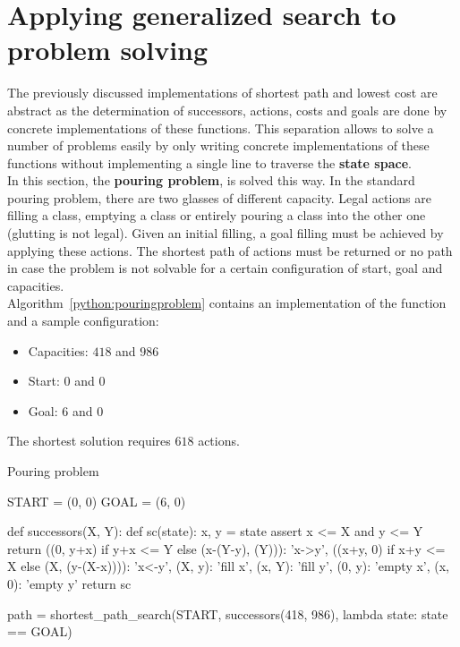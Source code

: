 \documentclass{report}
\begin{document}
\section{Applying generalized search to problem solving}
The previously discussed implementations of shortest path and lowest cost are abstract as the determination of successors, actions, costs and goals are done by concrete implementations of these functions.
This separation allows to solve a number of problems easily by only writing concrete implementations of these functions without implementing a single line to traverse the {\bf state space}.
\\
In this section, the {\bf pouring problem}, is solved this way. In the standard pouring problem, there are two glasses of different capacity.
Legal actions are filling a class, emptying a class or entirely pouring a class into the other one (glutting is not legal).
Given an initial filling, a goal filling must be achieved by applying these actions.
The shortest path of actions must be returned or no path in case the problem is not solvable for a certain configuration of start, goal and capacities.
\\
Algorithm~\ref{python:pouringproblem} contains an implementation of the function and a sample configuration:
\begin{itemize}
\item Capacities: $418$ and $986$
\item Start: $0$ and $0$
\item Goal: $6$ and $0$
\end{itemize}

The shortest solution requires $618$ actions.


\begin{algorithm}
\caption{Pouring problem}
\label{python:pouringproblem}
\begin{python}
START = (0, 0)
GOAL = (6, 0)

def successors(X, Y):
    def sc(state):
        x, y = state
        assert x <= X and y <= Y
        return {((0, y+x) if y+x <= Y else (x-(Y-y), (Y))): 'x->y',
                ((x+y, 0) if x+y <= X else (X, (y-(X-x)))): 'x<-y',
                (X, y): 'fill x',
                (x, Y): 'fill y',
                (0, y): 'empty x',
                (x, 0): 'empty y'}
    return sc

path = shortest_path_search(START,
       successors(418, 986),
       lambda state: state == GOAL)
\end{python}
\end{algorithm}
\end{document}
